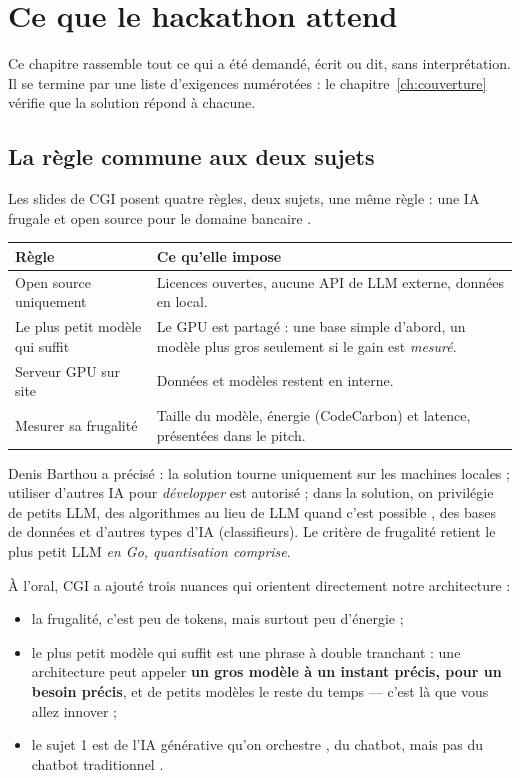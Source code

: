 \chapter{Ce que le hackathon attend}
\label{ch:attentes}

Ce chapitre rassemble tout ce qui a été demandé, écrit ou dit, sans interprétation. Il se termine
par une liste d'exigences numérotées : le chapitre~\ref{ch:couverture} vérifie que la solution
répond à chacune.

\section{La règle commune aux deux sujets}

Les slides de CGI posent quatre règles, \og deux sujets, une même règle : une IA frugale et open
source pour le domaine bancaire \fg.

\begin{center}\small
\begin{tabularx}{\textwidth}{@{}L{4cm} Y@{}}
\toprule
\textbf{Règle} & \textbf{Ce qu'elle impose} \\
\midrule
Open source uniquement & Licences ouvertes, aucune API de LLM externe, données en local. \\
Le plus petit modèle qui suffit & Le GPU est partagé : une base simple d'abord, un modèle plus gros
  seulement si le gain est \emph{mesuré}. \\
Serveur GPU sur site & Données et modèles restent en interne. \\
Mesurer sa frugalité & Taille du modèle, énergie (CodeCarbon) et latence, présentées dans le
  pitch. \\
\bottomrule
\end{tabularx}
\end{center}

Denis Barthou a précisé : la solution tourne uniquement sur les machines locales ; utiliser d'autres
IA pour \emph{développer} est autorisé ; dans la solution, on privilégie de petits LLM, \og des
algorithmes au lieu de LLM quand c'est possible \fg, des bases de données et d'autres types d'IA
(classifieurs). Le critère de frugalité retient le plus petit LLM \emph{en Go, quantisation
comprise}.

À l'oral, CGI a ajouté trois nuances qui orientent directement notre architecture :
\begin{itemize}
  \item la frugalité, c'est peu de tokens, \og mais surtout \fg{} peu d'énergie ;
  \item \og le plus petit modèle qui suffit \fg{} est une phrase \og à double tranchant \fg : une
        architecture peut appeler \textbf{un gros modèle à un instant précis, pour un besoin
        précis}, et de petits modèles le reste du temps --- \og c'est là que vous allez innover \fg ;
  \item le sujet 1 est \og de l'IA générative qu'on orchestre \fg, \og du chatbot, mais pas du
        chatbot traditionnel \fg.
\end{itemize}

